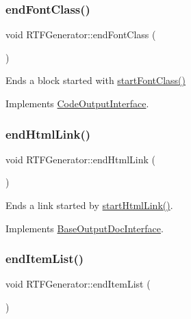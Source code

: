 \subsubsection{\texorpdfstring{endFontClass()}{endFontClass()}}
{\footnotesize\ttfamily void R\+T\+F\+Generator\+::end\+Font\+Class (\begin{DoxyParamCaption}{ }\end{DoxyParamCaption})\hspace{0.3cm}{\ttfamily [virtual]}}

Ends a block started with \mbox{\hyperlink{class_r_t_f_generator_a84114371fc0f3865e0321c2df8ce0ae9}{start\+Font\+Class()}} 

Implements \mbox{\hyperlink{class_code_output_interface_a2b8ac05a391dae36793aa3aa8714a0f6}{Code\+Output\+Interface}}.

\mbox{\label{class_r_t_f_generator_a73a4ea59114077ea461ff16757c8429b}} 
\subsubsection{\texorpdfstring{endHtmlLink()}{endHtmlLink()}}
{\footnotesize\ttfamily void R\+T\+F\+Generator\+::end\+Html\+Link (\begin{DoxyParamCaption}{ }\end{DoxyParamCaption})\hspace{0.3cm}{\ttfamily [virtual]}}

Ends a link started by \mbox{\hyperlink{class_r_t_f_generator_a265ab601396745bb97d5c6cee59329d6}{start\+Html\+Link()}}. 

Implements \mbox{\hyperlink{class_base_output_doc_interface_afb808c1c487135d4fb2156d0675b387e}{Base\+Output\+Doc\+Interface}}.

\mbox{\label{class_r_t_f_generator_a530e2868f7db6b92a4423cdee7fc9f75}} 
\subsubsection{\texorpdfstring{endItemList()}{endItemList()}}
{\footnotesize\ttfamily void R\+T\+F\+Generator\+::end\+Item\+List (\begin{DoxyParamCaption}{ }\end{DoxyParamCaption})\hspace{0.3cm}{\ttfamily [virtual]}}

